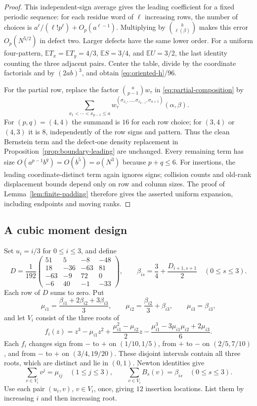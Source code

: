 \begin{proof}
This independent-sign average gives the leading coefficient for a fixed
periodic sequence: for each residue word of $\ell$ increasing rows, the
number of choices is $a^\ell/(\ell!p^\ell)+O_p(a^{\ell-1})$.
Multiplying by $\binom b{\ell(\beta)}$ makes this error $O_p(N^{5/2})$
in defect two.  Larger defects have the same lower order.  For a uniform
four-pattern, $\mathbb E T_x=\mathbb E T_y=4/3$, $\mathbb ES=3/4$,
and $\mathbb EU=3/2$, the last identity counting the three adjacent pairs.
Center the table, divide by the coordinate factorials and by
$(2ab)^3$, and obtain \eqref{eq:oriented-h}/$96$.

For the partial row, replace the factor $\binom a{p-1}w_\tau$ in
\eqref{eq:partial-composition} by
\[
 \sum_{x_1<\cdots<x_{p-1}\le a}
 w^{(\sigma_{x_1},\ldots,\sigma_{x_{p-1}},\sigma_{a+1})}_\tau(\alpha,\beta).
\]
For $(p,q)=(4,4)$ the summand is $16$ for each row choice; for
$(3,4)$ or $(4,3)$ it is $8$, independently of the row signs and pattern.
Thus the clean Bernstein term and the defect-one density replacement in
Proposition~\ref{prop:boundary-leading} are unchanged.  Every remaining
term has size $O(a^{p-1}b^q)=O(b^5)=o(N^3)$ because $p+q\le6$.
For insertions, the leading coordinate-distinct term again ignores signs;
collision counts and old-rank displacement bounds depend only on row and
column sizes.  The proof of Lemma~\ref{lem:finite-padding} therefore gives
the asserted uniform expansion, including endpoints and moving ranks.
\end{proof}

\subsection{A cubic moment design}

Set $u_i=i/3$ for $0\le i\le3$, and define
\[
 D=\frac1{192}\begin{pmatrix}
 51&5&-8&-48\\
 18&-36&-63&81\\
 -63&-9&72&0\\
 -6&40&-1&-33
 \end{pmatrix},\qquad
 \beta_{is}=\frac34+\frac{D_{i+1,s+1}}2\quad(0\le s\le3).
\]
Each row of $D$ sums to zero.  Put
\[
 \mu_{i1}=\frac{\beta_{i1}+2\beta_{i2}+3\beta_{i3}}3,
 \qquad \mu_{i2}=\frac{\beta_{i2}}3+\beta_{i3},
 \qquad \mu_{i3}=\beta_{i3},
\]
and let $V_i$ consist of the three roots of
\[
 f_i(z)=z^3-\mu_{i1}z^2
       +\frac{\mu_{i1}^2-\mu_{i2}}2z
       -\frac{\mu_{i1}^3-3\mu_{i1}\mu_{i2}+2\mu_{i3}}6.
\]
Each $f_i$ changes sign from $-$ to $+$ on $(1/10,1/5)$,
from $+$ to $-$ on $(2/5,7/10)$, and from $-$ to $+$ on $(3/4,19/20)$.
These disjoint intervals contain all three roots, which are distinct and
lie in $(0,1)$.  Newton identities give
\[
 \sum_{v\in V_i}v^j=\mu_{ij}\quad(1\le j\le3),
 \qquad \sum_{v\in V_i}B_s(v)=\beta_{is}\quad(0\le s\le3).
\]
Use each pair $(u_i,v)$, $v\in V_i$, once, giving $12$ insertion
locations.  List them by increasing $i$ and then increasing root.

